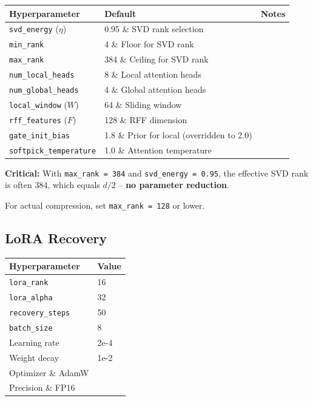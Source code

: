 \begin{table}[H]
\centering
\small
\begin{tabular}{lll}
\toprule
\textbf{Hyperparameter} & \textbf{Default} & \textbf{Notes} \\
\midrule
\texttt{svd\_energy} ($\eta$) & 0.95 \& SVD rank selection \\
\texttt{min\_rank} & 4 \& Floor for SVD rank \\
\texttt{max\_rank} & 384 \& Ceiling for SVD rank \\
\texttt{num\_local\_heads} & 8 \& Local attention heads \\
\texttt{num\_global\_heads} & 4 \& Global attention heads \\
\texttt{local\_window} ($W$) & 64 \& Sliding window \\
\texttt{rff\_features} ($F$) & 128 \& RFF dimension \\
\texttt{gate\_init\_bias} & 1.8 \& Prior for local (overridden to 2.0) \\
\texttt{softpick\_temperature} & 1.0 \& Attention temperature \\
\bottomrule
\end{tabular}
\end{table}

\textbf{Critical:} With \texttt{max\_rank = 384} and \texttt{svd\_energy = 0.95}, the effective 
SVD rank is often 384, which equals $d/2$ -- \textbf{no parameter reduction}.

For actual compression, set \texttt{max\_rank = 128} or lower.

\subsection{LoRA Recovery}

\begin{table}[H]
\centering
\small
\begin{tabular}{ll}
\toprule
\textbf{Hyperparameter} & \textbf{Value} \\
\midrule
\texttt{lora\_rank} & 16 \\
\texttt{lora\_alpha} & 32 \\
\texttt{recovery\_steps} & 50 \\
\texttt{batch\_size} & 8 \\
Learning rate & 2e-4 \\
Weight decay & 1e-2 \\
Optimizer \& AdamW \\
Precision \& FP16 \\
\bottomrule
\end{tabular}
\end{table}

